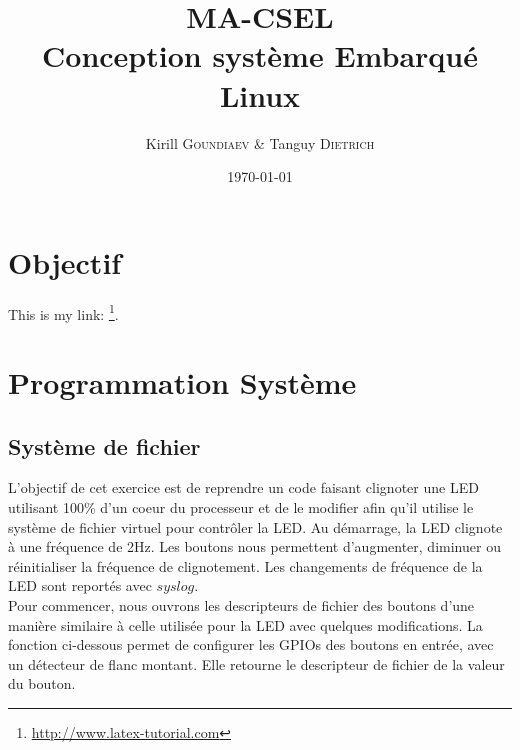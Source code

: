 \documentclass[
	a4paper, %
	10pt, %
]{CSUniSchoolLabReport}
\title{MA-CSEL \\ Conception syst\`eme Embarqué Linux } %
\author{Kirill \textsc{Goundiaev} \& Tanguy \textsc{Dietrich}} %
\date{\today} %
\begin{document}
\maketitle %

\begin{figure}[H] %
\label{fig:speciation}
\end{figure}


\newpage

\tableofcontents
\newpage


\section{Objectif}

This is my link: \footnote{\href{http://www.latex-tutorial.com}{http://www.latex-tutorial.com}}.

\section{Programmation Système}

\subsection{Système de fichier}\label{filesystem}
L'objectif de cet exercice est de reprendre un code faisant clignoter une LED utilisant 100\% d'un coeur du processeur et de le modifier afin qu'il utilise le système de fichier virtuel pour contrôler la LED. Au démarrage, la LED clignote à une fréquence de 2Hz. Les boutons nous permettent d'augmenter, diminuer ou réinitialiser la fréquence de clignotement. Les changements de fréquence de la LED sont reportés avec $syslog$.\\
Pour commencer, nous ouvrons les descripteurs de fichier des boutons d'une manière similaire à celle utilisée pour la LED avec quelques modifications. La fonction ci-dessous permet de configurer les GPIOs des boutons en entrée, avec un détecteur de flanc montant. Elle retourne le descripteur de fichier de la valeur du bouton.\\
\end{document}
